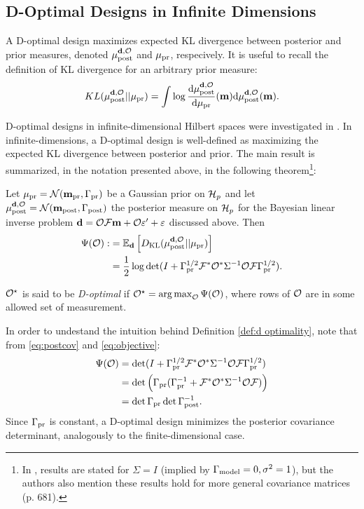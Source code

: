 \subsection{D-Optimal Designs in Infinite Dimensions}\label{subsec:D optimal design} 
A D-optimal design maximizes expected KL divergence between posterior
and prior measures, denoted $\mu_{\textup{post}}^{\mathbf{d}, \mathcal{O}}$ and $\mu_{\textup{pr}}$, respecively. It is
useful to recall the definition of KL divergence for an arbitrary
prior measure:
$$
KL(\mu_{\textup{post}}^{\mathbf{d}, \mathcal{O}}||\mu_{\textup{pr}}) = \int \log \frac{\text{\textup{d}} \mu_{\textup{post}}^{\mathbf{d}, \mathcal{O}}}{\text{\textup{d}} \mu_{\textup{pr}}}(\mathbf{m}) \text{\textup{d}} \mu_{\textup{post}}^{\mathbf{d}, \mathcal{O}}(\mathbf{m}).
$$

D-optimal designs in infinite-dimensional Hilbert spaces were
investigated in \cite{AlexanderianGloorGhattas14}. In
infinite-dimensions, a D-optimal design is well-defined as maximizing
the expected KL divergence between posterior and prior. The main
result is summarized, in the notation presented above, in the
following theorem\footnote{In \cite{AlexanderianGloorGhattas14},
results are stated for $\Sigma=I$ (implied by $\Gamma_{\textup{model}} =
0,\sigma^2=1$), but the authors also mention these results hold for
more general covariance matrices (p. 681).}:
\begin{theorem}\label{thm:d optimality}
  Let $\mu_{\textup{pr}} = \mathcal{N}(\mathbf{m}_{\textup{pr}},\Gamma_{\textup{pr}})$ be a Gaussian prior on $\mathcal{H}_p$
  and let $\mu_{\textup{post}}^{\mathbf{d}, \mathcal{O}} = \mathcal{N}(\mathbf{m}_{\textup{post}},\Gamma_{\textup{post}})$ the posterior measure
  on $\mathcal{H}_p$ for the Bayesian linear inverse problem $\mathbf{d} = \mathcal{O}
  \mathcal{F}\mathbf{m} + \mathcal{O} \varepsilon' + \varepsilon$ discussed above. Then
  \begin{align}\label{eq:objective}
    \begin{split}
      \tar( \obs) :&= \mathbb{E}_{\data}\left [ D_{\text{KL}} (\post || \pr ) \right ] \\
      &= \frac12 \log \det 
      ( I + \prcov^{1/2}  \fwd ^* \obs^* \Sigma^{-1} \obs \fwd \prcov^{1/2}).
    \end{split}
  \end{align}
\end{theorem}
\begin{definition}\label{def:d optimality}
  $\mathcal{O}^{\star}$ is said to be \emph{D-optimal} if $\mathcal{O}^{\star} =
  \operatorname*{arg\,max}_{\mathcal{O}} \Psi(\mathcal{O})$, where rows of $\mathcal{O}$ are in some allowed
  set of measurement.
\end{definition}

\noindent In order to undestand the intuition behind Definition
\ref{def:d optimality}, note that from \eqref{eq:postcov} and
\eqref{eq:objective}:
\begin{align*}
  \begin{split}
    \tar(\obs) &= \det ( I + \prcov^{1/2}  \fwd ^* \obs^* \Sigma^{-1} \obs \fwd \prcov^{1/2}) \\
    &= \det \Big( \prcov ( \prcov^{-1} + \fwd ^* \obs^* \Sigma^{-1} \obs \fwd) \Big )\\
    &= \det \prcov \det \postcov^{-1}.
  \end{split}
\end{align*}
Since $\Gamma_{\textup{pr}}$ is constant, a D-optimal design minimizes the posterior
covariance determinant, analogously to the finite-dimensional case.


